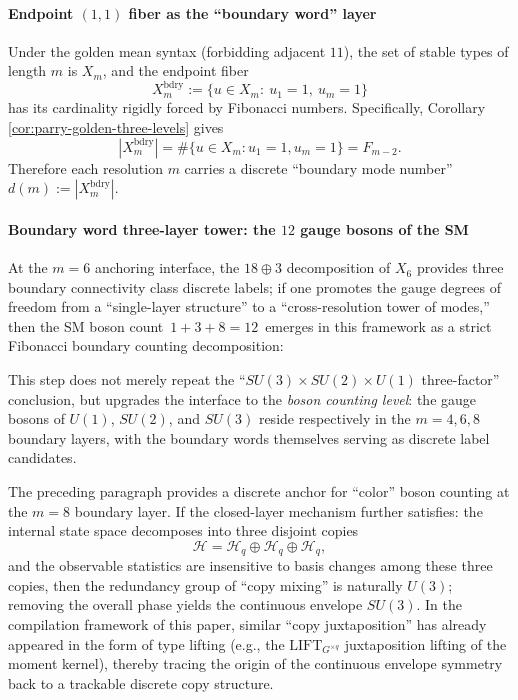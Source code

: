 \label{subsec:bdry-tower-zeck-gut-part1}
\paragraph{Endpoint \texorpdfstring{$(1,1)$}{(1,1)} fiber as the ``boundary word'' layer}
Under the golden mean syntax (forbidding adjacent \(11\)), the set of stable types of length \(m\) is \(X_m\), and the endpoint fiber
\[
X_m^{\mathrm{bdry}}
:=\{u\in X_m:\ u_1=1,\ u_m=1\}
\]
has its cardinality rigidly forced by Fibonacci numbers. Specifically, Corollary \ref{cor:parry-golden-three-levels} gives
\[
|X_m^{\mathrm{bdry}}|
=\#\{u\in X_m:u_1=1,u_m=1\}
=F_{m-2}.
\]
Therefore each resolution \(m\) carries a discrete ``boundary mode number'' \(d(m):=|X_m^{\mathrm{bdry}}|\).

\paragraph{Boundary word three-layer tower: the \(12\) gauge bosons of the SM}
At the \(m=6\) anchoring interface, the \(18\oplus 3\) decomposition of \(X_6\) provides three boundary connectivity class discrete labels;
if one promotes the gauge degrees of freedom from a ``single-layer structure'' to a ``cross-resolution tower of modes,'' then the SM boson count
\(\,1+3+8=12\,\)
emerges in this framework as a strict Fibonacci boundary counting decomposition:

This step does not merely repeat the ``\(SU(3)\times SU(2)\times U(1)\) three-factor'' conclusion, but upgrades the interface to the \emph{boson counting level}:
the gauge bosons of \(U(1)\), \(SU(2)\), and \(SU(3)\) reside respectively in the \(m=4,6,8\) boundary layers,
with the boundary words themselves serving as discrete label candidates.

\begin{remark}\label{rem:color-as-three-copy-envelope}
The preceding paragraph provides a discrete anchor for ``color'' boson counting at the \(m=8\) boundary layer.
If the closed-layer mechanism further satisfies: the internal state space decomposes into three disjoint copies
\[
\mathcal{H}=\mathcal{H}_q\oplus\mathcal{H}_q\oplus\mathcal{H}_q,
\]
and the observable statistics are insensitive to basis changes among these three copies,
then the redundancy group of ``copy mixing'' is naturally \(U(3)\); removing the overall phase yields the continuous envelope \(SU(3)\).
In the compilation framework of this paper, similar ``copy juxtaposition'' has already appeared in the form of type lifting (e.g., the \(\mathrm{LIFT}_{G^{\times q}}\) juxtaposition lifting of the moment kernel),
thereby tracing the origin of the continuous envelope symmetry back to a trackable discrete copy structure.
\end{remark}

